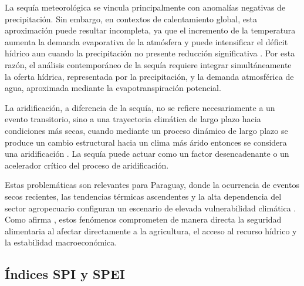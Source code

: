 \documentclass[11pt,a4paper]{article}
\begin{document}
La sequía meteorológica se vincula principalmente con anomalías negativas de precipitación. Sin embargo, en contextos de calentamiento global, esta aproximación puede resultar incompleta, ya que el incremento de la temperatura aumenta la demanda evaporativa de la atmósfera y puede intensificar el déficit hídrico aun cuando la precipitación no presente reducción significativa \citep{trenberth_global_2014,massondelmotte2021}. Por esta razón, el análisis contemporáneo de la sequía requiere integrar simultáneamente la oferta hídrica, representada por la precipitación, y la demanda atmosférica de agua, aproximada mediante la evapotranspiración potencial.

La aridificación, a diferencia de la sequía, no se refiere necesariamente a un evento transitorio, sino a una trayectoria climática de largo plazo hacia condiciones más secas, cuando mediante un proceso dinámico de largo
plazo se produce un cambio estructural hacia un clima más árido entonces se considera una aridificación \citep{vicenteserrano2010}. La sequía puede actuar como un factor desencadenante o un acelerador crítico del proceso de aridificación. 

Estas problemáticas son relevantes para Paraguay, donde la ocurrencia de eventos secos recientes, las tendencias térmicas ascendentes y la alta dependencia del sector agropecuario configuran un escenario de elevada vulnerabilidad climática \citep{cepal2014}. Como afirma \citet{mishra2010}, estos fenómenos comprometen de manera
directa la seguridad alimentaria al afectar directamente a la agricultura, el acceso al recurso hídrico y la estabilidad macroeconómica.
\subsection{Índices SPI y SPEI}
\end{document}
